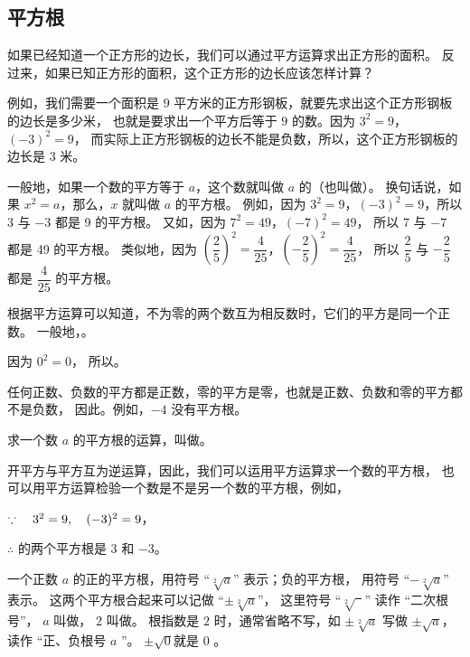 \subsection{平方根}\label{subsec:9-1}

\begin{enhancedline}
如果已经知道一个正方形的边长，我们可以通过平方运算求出正方形的面积。
反过来，如果已知正方形的面积，这个正方形的边长应该怎样计算？

例如，我们需要一个面积是 $9$ 平方米的正方形钢板，就要先求出这个正方形钢板的边长是多少米，
也就是要求出一个平方后等于 $9$ 的数。因为 $3^2 = 9$，$(-3)^2 = 9$，
而实际上正方形钢板的边长不能是负数，所以，这个正方形钢板的边长是 $3$ 米。

一般地，如果一个数的平方等于 $a$，这个数就叫做 $a$ 的（也叫做）。
换句话说，如果 $x^2 = a$，那么，$x$ 就叫做 $a$ 的平方根。
例如，因为 $3^2 = 9$，$(-3)^2 = 9$，所以 $3$ 与 $-3$ 都是 9 的平方根。
又如，因为 $7^2 = 49$，$(-7)^2 = 49$， 所以 $7$ 与 $-7$ 都是 49 的平方根。
类似地，因为 $\left(\dfrac{2}{5}\right)^2 = \dfrac{4}{25}$，$\left(-\dfrac{2}{5}\right)^2 = \dfrac{4}{25}$，
所以 $\dfrac{2}{5}$ 与 $-\dfrac{2}{5}$ 都是 $\dfrac{4}{25}$ 的平方根。

根据平方运算可以知道，不为零的两个数互为相反数时，它们的平方是同一个正数。
一般地，。

因为 $0^2 = 0$， 所以。

任何正数、负数的平方都是正数，零的平方是零，也就是正数、负数和零的平方都不是负数，
因此。例如，$-4$ 没有平方根。

求一个数 $a$ 的平方根的运算，叫做。

开平方与平方互为逆运算，因此，我们可以运用平方运算求一个数的平方根，
也可以用平方运算检验一个数是不是另一个数的平方根，例如，

$\because \quad 3^2 = 9 ,\quad (-3)^2 = 9$，

$\therefore$  的两个平方根是 $3$ 和 $-3$。

一个正数 $a$ 的正的平方根，用符号 “$\sqrt[2]{a}$” 表示；负的平方根， 用符号 “$-\sqrt[2]{a}$” 表示。
这两个平方根合起来可以记做 “$\pm\sqrt[2]{a}$”， 这里符号 “$\sqrt[2]{\phantom{a}}$” 读作 “二次根号”，
$a$ 叫做， $2$ 叫做。
根指数是 $2$ 时，通常省略不写，如 $\pm\sqrt[2]{a}$ 写做 $\pm \sqrt{a}$，读作 “正、负根号 $a$ ”。
$\pm\sqrt{0}$就是 0 。


\end{enhancedline}
